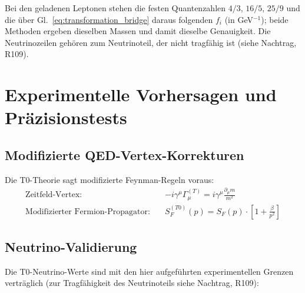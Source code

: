 Bei den geladenen Leptonen stehen die festen Quantenzahlen $4/3$, $16/5$, $25/9$ und die über Gl.~\ref{eq:transformation_bridge} daraus folgenden $f_i$ (in GeV$^{-1}$); beide Methoden ergeben dieselben Massen und damit dieselbe Genauigkeit. Die Neutrinozeilen gehören zum Neutrinoteil, der nicht tragfähig ist (siehe Nachtrag, R109).

\section{Experimentelle Vorhersagen und Präzisionstests}
\label{sec:experimental_predictions}

\subsection{Modifizierte QED-Vertex-Korrekturen}
\label{subsec:qed_corrections}

Die T0-Theorie sagt modifizierte Feynman-Regeln voraus:
\begin{align}
	\text{Zeitfeld-Vertex:} \quad &-i\gamma^\mu\Gamma_\mu^{(T)} = i\gamma^\mu\frac{\partial_\mu m}{m^2} \\
	\text{Modifizierter Fermion-Propagator:} \quad &S_F^{(T0)}(p) = S_F(p) \cdot \left[1 + \frac{\beta}{p^2}\right]
\end{align}

\subsection{Neutrino-Validierung}
\label{subsec:neutrino_validation}

Die T0-Neutrino-Werte sind mit den hier aufgeführten experimentellen Grenzen verträglich (zur Tragfähigkeit des Neutrinoteils siehe Nachtrag, R109):

\begin{table}[H]
	\centering
	\caption{T0-Neutrino-Vorhersagen vs. experimentelle Einschränkungen}
	\label{tab:neutrino_validation}
\end{table}

